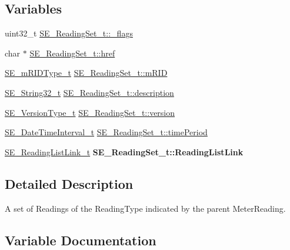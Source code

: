 \subsection*{Variables}
\begin{DoxyCompactItemize}
\item 
uint32\+\_\+t \hyperlink{group__ReadingSet_ga447ad86f7f9c278c2e3f166e89f6955c}{S\+E\+\_\+\+Reading\+Set\+\_\+t\+::\+\_\+flags}
\item 
char $\ast$ \hyperlink{group__ReadingSet_gabdc2579f4df7fa4a87a23c41d057cf51}{S\+E\+\_\+\+Reading\+Set\+\_\+t\+::href}
\item 
\hyperlink{group__mRIDType_gac74622112f3a388a2851b2289963ba5e}{S\+E\+\_\+m\+R\+I\+D\+Type\+\_\+t} \hyperlink{group__ReadingSet_gadeeb229d0f424fe8275177847d9764fb}{S\+E\+\_\+\+Reading\+Set\+\_\+t\+::m\+R\+ID}
\item 
\hyperlink{group__String32_gac9f59b06b168b4d2e0d45ed41699af42}{S\+E\+\_\+\+String32\+\_\+t} \hyperlink{group__ReadingSet_gad67b558463072ec2819dd73f6ef2ee7b}{S\+E\+\_\+\+Reading\+Set\+\_\+t\+::description}
\item 
\hyperlink{group__VersionType_ga4b8d27838226948397ed99f67d46e2ae}{S\+E\+\_\+\+Version\+Type\+\_\+t} \hyperlink{group__ReadingSet_gab59f9eff3274eb6686af1cb1165b18b0}{S\+E\+\_\+\+Reading\+Set\+\_\+t\+::version}
\item 
\hyperlink{structSE__DateTimeInterval__t}{S\+E\+\_\+\+Date\+Time\+Interval\+\_\+t} \hyperlink{group__ReadingSet_gac688cdc34b6fb2eda9be0d9cd660f8ae}{S\+E\+\_\+\+Reading\+Set\+\_\+t\+::time\+Period}
\item 
\mbox{\label{group__ReadingSet_ga933adb4afc63dc62945d4522abd1e2e6}} 
\hyperlink{structSE__ReadingListLink__t}{S\+E\+\_\+\+Reading\+List\+Link\+\_\+t} {\bfseries S\+E\+\_\+\+Reading\+Set\+\_\+t\+::\+Reading\+List\+Link}
\end{DoxyCompactItemize}


\subsection{Detailed Description}
A set of Readings of the Reading\+Type indicated by the parent Meter\+Reading. 

\subsection{Variable Documentation}
\mbox{\label{group__ReadingSet_ga447ad86f7f9c278c2e3f166e89f6955c}} 
